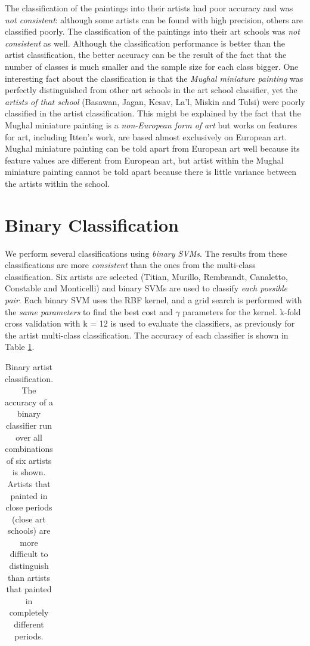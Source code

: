 \documentclass[11pt,a4paper,twoside,openright]{report}
\begin{document}
The classification of the paintings into their artists had poor accuracy and
was \emph{not consistent}: although some artists can be found with high
precision, others are classified poorly.  The classification of the paintings
into their art schools was \emph{not consistent} as well.  Although the
classification performance is better than the artist classification, the better
accuracy can be the result of the fact that the number of classes is much
smaller and the sample size for each class bigger.  One interesting fact about
the classification is that the \emph{Mughal miniature painting} was perfectly
distinguished from other art schools in the art school classifier, yet the
\emph{artists of that school} (Basawan, Jagan, Kesav, La'l, Miskin and Tulsi)
were poorly classified in the artist classification.  This might be explained
by the fact that the Mughal miniature painting is a \emph{non-European form of
art} but works on features for art, including Itten's work, are based almost
exclusively on European art.  Mughal miniature painting can be told apart from
European art well because its feature values are different from European art,
but artist within the Mughal miniature painting cannot be told apart because
there is little variance between the artists within the school.

\section{Binary Classification}

We perform several classifications using \emph{binary SVMs}.  The results from
these classifications are more \emph{consistent} than the ones from the
multi-class classification.  Six artists are selected (Titian, Murillo,
Rembrandt, Canaletto, Constable and Monticelli) and binary SVMs are used to
classify \emph{each possible pair}.  Each binary SVM uses the RBF kernel, and a
grid search is performed with the \emph{same parameters} to find the best cost
and $\gamma$ parameters for the kernel.  k-fold cross validation with k = 12 is
used to evaluate the classifiers, as previously for the artist multi-class
classification.  The accuracy of each classifier is shown in Table
\ref{tab:foldart}.

\begin{table}[ptb]
\centering
\begin{tabular}{r||r|r|r|r|r}
\toprule

\bottomrule
\end{tabular}
\caption[Binary artist classification]{Binary artist classification.  The
accuracy of a binary classifier run over all combinations of six artists is
shown.  Artists that painted in close periods (close art schools) are more
difficult to distinguish than artists that painted in completely different
periods.}
\label{tab:foldart}
\end{table}
\end{document}

